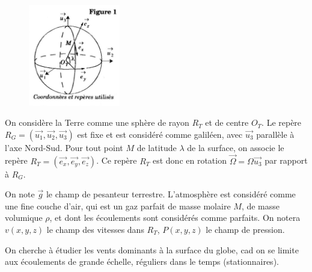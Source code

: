 \documentclass{report}
\begin{document}
\begin{figure}
\includegraphics[width=4cm]{meca_flu5.png}
\end{figure}

On considère la Terre comme une sphère de rayon $R_T$ et de centre $O_T$. Le repère $R_G=(\vec{u_1},\vec{u_2},\vec{u_3})$ est fixe et est considéré comme galiléen, avec $\vec{u_3}$ parallèle à l'axe Nord-Sud. Pour tout point $M$ de latitude $\lambda$ de la surface, on associe le repère $R_T=(\vec{e_x},\vec{e_y},\vec{e_z})$. Ce repère $R_T$ est donc en rotation $\vec{\Omega}=\Omega\vec{u_3}$ par rapport à $R_G$.


On note $\vec{g}$ le champ de pesanteur terrestre. L'atmosphère est considéré comme une fine couche d'air, qui est un gaz parfait de masse molaire $M$, de masse volumique $\rho$, et dont les écoulements sont considérés comme parfaits. On notera $v(x,y,z)$ le champ des vitesses dans $R_T$, $P(x,y,z)$ le champ de pression.

On cherche à étudier les vents dominants à la surface du globe, cad on se limite aux écoulements de grande échelle, réguliers dans le temps (stationnaires). 
\end{document}
